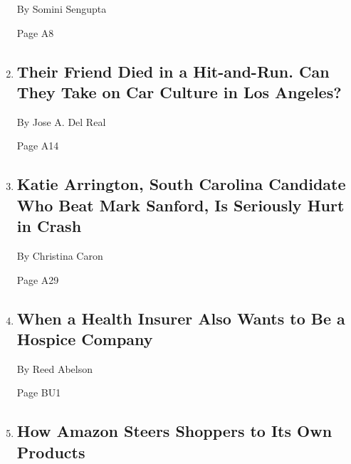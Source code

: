 \begin{enumerate}
  By Somini Sengupta

  Page A8
\item
  \href{/2018/06/23/us/los-angeles-cyclists-bikes-car-culture-collision-activism.html}{}

  \hypertarget{their-friend-died-in-a-hit-and-run-can-they-take-on-car-culture-in-los-angeles}{%
  \subsection{Their Friend Died in a Hit-and-Run. Can They Take on Car
  Culture in Los
  Angeles?}\label{their-friend-died-in-a-hit-and-run-can-they-take-on-car-culture-in-los-angeles}}

  By Jose A. Del Real

  Page A14
\item
  \href{/2018/06/23/us/politics/katie-arrington-crash-south-carolina.html}{}

  \hypertarget{katie-arrington-south-carolina-candidate-who-beat-mark-sanford-is-seriously-hurt-in-crash}{%
  \subsection{Katie Arrington, South Carolina Candidate Who Beat Mark
  Sanford, Is Seriously Hurt in
  Crash}\label{katie-arrington-south-carolina-candidate-who-beat-mark-sanford-is-seriously-hurt-in-crash}}

  By Christina Caron

  Page A29
\item
  \href{/2018/06/22/health/hospice-humana-private-equity.html}{}

  \hypertarget{when-a-health-insurer-also-wants-to-be-a-hospice-company}{%
  \subsection{When a Health Insurer Also Wants to Be a Hospice
  Company}\label{when-a-health-insurer-also-wants-to-be-a-hospice-company}}

  By Reed Abelson

  Page BU1
\item
  \href{/2018/06/23/business/amazon-the-brand-buster.html}{}

  \hypertarget{how-amazon-steers-shoppers-to-its-own-products}{%
  \subsection{How Amazon Steers Shoppers to Its Own
  Products}\label{how-amazon-steers-shoppers-to-its-own-products}}


\end{enumerate}

